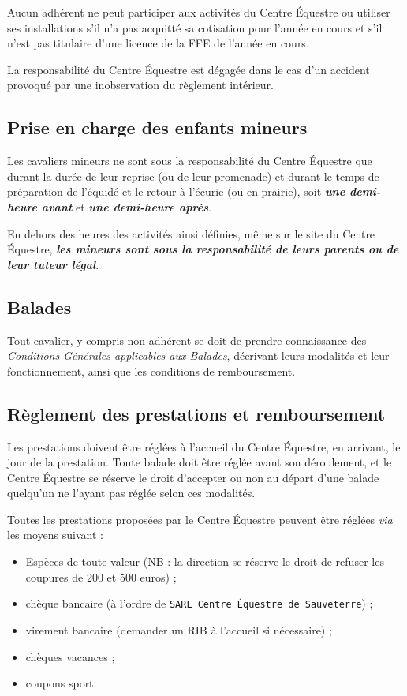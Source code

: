 \documentclass[11pt,a4paper]{article}
\begin{document}
Aucun adhérent ne peut participer aux activités du Centre Équestre ou utiliser ses installations s'il n'a pas acquitté sa cotisation pour l'année en cours et s'il n'est pas titulaire d'une licence de la FFE de l'année en cours.

La responsabilité du Centre Équestre est dégagée dans le cas d'un accident provoqué par une inobservation du règlement intérieur.

\subsection{Prise en charge des enfants mineurs}
Les cavaliers mineurs ne sont sous la responsabilité du Centre Équestre que durant la durée de leur reprise (ou de leur promenade) et durant le temps de préparation de l'équidé et le retour à l'écurie (ou en prairie), soit \textit{\textbf{une demi-heure avant}} et \textit{\textbf{une demi-heure après}}.

En dehors des heures des activités ainsi définies, même sur le site du Centre Équestre, \textit{\textbf{les mineurs sont sous la responsabilité de leurs parents ou de leur tuteur légal}}.

\subsection{Balades}

Tout cavalier, y compris non adhérent se doit de prendre connaissance des \textit{Conditions Générales applicables aux Balades}, décrivant leurs modalités et leur fonctionnement, ainsi que les conditions de remboursement.

\subsection{Règlement des prestations et remboursement}

Les prestations doivent être réglées à l'accueil du Centre Équestre, en arrivant, le jour de la prestation. Toute balade doit être réglée avant son déroulement, et le Centre Équestre se réserve le droit d'accepter ou non au départ d'une balade quelqu'un ne l'ayant pas réglée selon ces modalités.

Toutes les prestations proposées par le Centre Équestre peuvent être réglées \textit{via} les moyens suivant :
\begin{itemize}[leftmargin=50pt]
  \item
  Espèces de toute valeur (NB : la direction se réserve le droit de refuser les coupures de 200 et 500 euros) ;
  \item
  chèque bancaire (à l'ordre de \texttt{SARL Centre Équestre de Sauveterre}) ;
  \item
  virement bancaire (demander un RIB à l'accueil si nécessaire) ;
  \item
  chèques vacances ;
  \item
  coupons sport.
\end{itemize}
\end{document}
